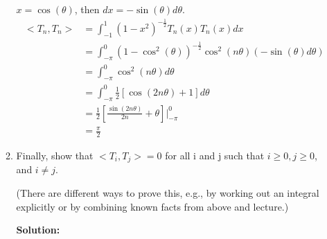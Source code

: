 \documentclass[conference,onecolumn]{IEEEtran}
\begin{document}
\begin{enumerate}[label=\arabic{enumi}.]
\begin{enumerate}
                        $x = \cos(\theta)$, then $dx = -\sin(\theta) d\theta$.
                        \begin{align*}
                              < T_n, T_n > & = \int_{-1}^{1} (1 - x^2)^{-\frac{1}{2}} T_n(x) T_n(x) dx                                     \\
                                           & = \int_{-\pi}^{0} (1 - \cos^2(\theta))^{-\frac{1}{2}} \cos^2(n\theta) (- \sin(\theta)d\theta) \\
                                           & = \int_{-\pi}^{0} \cos^2(n\theta) d\theta                                                     \\
                                           & = \int_{-\pi}^{0} \frac{1}{2} \left[ \cos(2n\theta) + 1 \right] d\theta                       \\
                                           & = \frac{1}{2} \left[ \frac{\sin(2n\theta)}{2n} + \theta \right] \rvert_{-\pi}^{0}             \\
                                           & = \frac{\pi}{2}
                        \end{align*}
                  \item Finally, show that $< T_i, T_j > = 0$ for all i and j such that $i \geq 0, j \geq 0$, and $i \neq j$.

                        (There are different ways to prove this, e.g., by working out an integral explicitly or by combining known facts from above and lecture.)

                        \textbf{Solution:}


\end{enumerate}
\end{enumerate}
\end{document}
